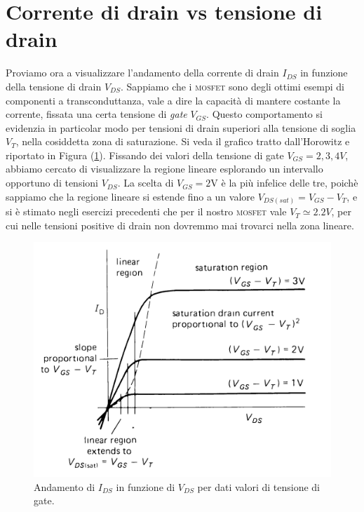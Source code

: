 \documentclass[journal, a4paper]{IEEEtran}
\begin{document}
\section{Corrente di drain vs tensione di drain}
Proviamo ora a visualizzare l'andamento della corrente di drain $I_{DS}$ in funzione della tensione di drain $V_{DS}$. Sappiamo che i \textsc{mosfet} sono degli ottimi esempi di componenti a transconduttanza, vale a dire la capacità di mantere costante la corrente, fissata una certa tensione di \textit{gate} $V_{GS}$. Questo comportamento si evidenzia in particolar modo per tensioni di drain superiori alla tensione di soglia $V_T$, nella cosiddetta zona di saturazione. Si veda il grafico tratto dall'Horowitz e riportato in Figura (\ref{fig:horo-linear_saturation}). Fissando dei valori della tensione di gate $V_{GS} = 2, 3, 4 \si{V}$, abbiamo cercato di visualizzare la regione lineare esplorando un intervallo opportuno di tensioni $V_{DS}$. La scelta di $V_{GS} = 2$V è la più infelice delle tre, poichè sappiamo che la regione lineare si estende fino a un valore $V_{DS(sat)} = V_{GS} - V_T$, e si è stimato negli esercizi precedenti che per il nostro \textsc{mosfet} vale $V_T \simeq 2.2 V$, per cui nelle tensioni positive di drain non dovremmo mai trovarci nella zona lineare.\\ 

\begin{figure}
\centering
\includegraphics[width=0.9\linewidth]{./horo-linear_saturation}
\caption{Andamento di $I_{DS}$ in funzione di $V_{DS}$ per dati valori di tensione di gate.}
\label{fig:horo-linear_saturation}
\end{figure}
\end{document}
